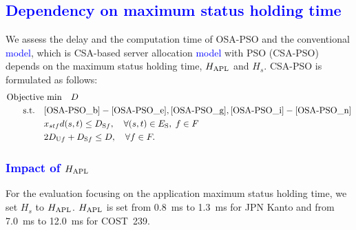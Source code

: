 \documentclass[10pt, letterpaper]{IEEEtran}
\newcommand\blue[1]{\textcolor{blue}{#1}}
\begin{document}
\begin{CJK}{UTF8}{ipxm}
\subsection{\blue{Dependency on maximum status holding time}}
\label{subsec:Dependency_on_maximum_status_holding_time}

We assess the delay and the computation time of OSA-PSO and the conventional \blue{model}, which is CSA-based server allocation \blue{model} with PSO (CSA-PSO) depends on the maximum status holding time, $H_{\rm APL}$ and $H_s$.
CSA-PSO is formulated as follows:
\begin{subequations} \label{CSA-PSO}
  \begin{align}
  \text{Objective}&\text{ min}\quad D \label{CSA-PSO_a} \\
  \rm{s.t.} \quad
  & \eqref{OSA-PSO_b}-\eqref{OSA-PSO_e}, \eqref{OSA-PSO_g}, \eqref{OSA-PSO_i}-\eqref{OSA-PSO_n} \label{CSA-PSO_b} \\
  &x_{stf}d(s,t) \le D_{\mathrm{S}f}, \quad \forall (s,t) \in E_{\rm{S}}, \; f \in F \label{CSA-PSO_c} \\
  &2D_{\mathrm{U}f} + D_{\mathrm{S}f} \leq D, \quad \forall f \in F. \label{CSA-PSO_d}
  \end{align}
\end{subequations}

\subsubsection{\blue{Impact of $H_{\rm APL}$}}

For the evaluation focusing on the application maximum status holding time, we set $H_s$ to $H_{\rm APL}$.
$H_{\rm APL}$ is set from 0.8~ms to 1.3~ms for JPN Kanto and from 7.0~ms to 12.0~ms for COST~239.


\end{CJK}
\end{document}
